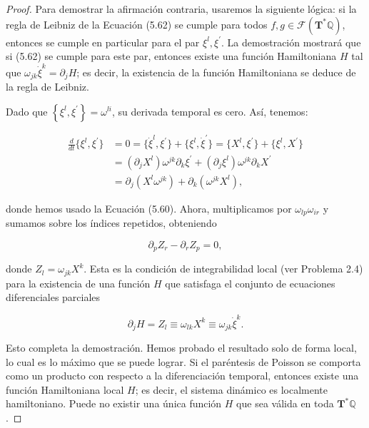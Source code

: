 \begin{proof}
  Para demostrar la afirmación contraria, usaremos la siguiente lógica: si la regla de Leibniz de la Ecuación (5.62) se cumple para todos \( f, g \in \mathcal{F}\left(\mathbf{T}^{*} \mathbb{Q}\right) \), entonces se cumple en particular para el par \( \xi^{l}, \xi^{\prime} \). La demostración mostrará que si (5.62) se cumple para este par, entonces existe una función Hamiltoniana \( H \) tal que \( \omega_{j k} \dot{\xi}^{k} = \partial_{j} H \); es decir, la existencia de la función Hamiltoniana se deduce de la regla de Leibniz.

Dado que \( \left\{\xi^{l}, \xi^{\prime}\right\} = \omega^{l i} \), su derivada temporal es cero. Así, tenemos:

\[
\begin{aligned}
\frac{d}{d t}\{\xi^{l}, \xi^{\prime}\} &= 0 = \{\dot{\xi}^{l}, \xi^{\prime}\} + \{\xi^{l}, \dot{\xi}^{\prime}\} = \{X^{l}, \xi^{\prime}\} + \{\xi^{l}, X^{\prime}\} \\
&= (\partial_{j} X^{l}) \omega^{j k} \partial_{k} \xi^{\prime} + (\partial_{j} \xi^{l}) \omega^{j k} \partial_{k} X^{\prime} \\
&= \partial_{j}(X^{l} \omega^{j k}) + \partial_{k}(\omega^{j k} X^{l}),
\end{aligned}
\]

donde hemos usado la Ecuación (5.60). Ahora, multiplicamos por \( \omega_{l p} \omega_{i r} \) y sumamos sobre los índices repetidos, obteniendo

\[
\partial_{p} Z_{r} - \partial_{r} Z_{p} = 0,
\]

donde \( Z_{l} = \omega_{j k} X^{k} \). Esta es la condición de integrabilidad local (ver Problema 2.4) para la existencia de una función \( H \) que satisfaga el conjunto de ecuaciones diferenciales parciales

\[
\partial_{j} H = Z_{l} \equiv \omega_{l k} X^{k} \equiv \omega_{j k} \dot{\xi}^{k}.
\]

Esto completa la demostración. Hemos probado el resultado solo de forma local, lo cual es lo máximo que se puede lograr. Si el paréntesis de Poisson se comporta como un producto con respecto a la diferenciación temporal, entonces existe una función Hamiltoniana local \( H \); es decir, el sistema dinámico es localmente hamiltoniano. Puede no existir una única función \( H \) que sea válida en toda \( \mathbf{T}^{*} \mathbb{Q} \).
\end{proof}